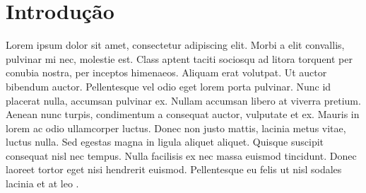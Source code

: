 \section{Introdução}
Lorem ipsum dolor sit amet, consectetur adipiscing elit. Morbi a elit convallis, pulvinar mi nec, molestie est. Class aptent taciti sociosqu ad litora torquent per conubia nostra, per inceptos himenaeos. Aliquam erat volutpat. Ut auctor bibendum auctor. Pellentesque vel odio eget lorem porta pulvinar. Nunc id placerat nulla, accumsan pulvinar ex. Nullam accumsan libero at viverra pretium. Aenean nunc turpis, condimentum a consequat auctor, vulputate et ex. Mauris in lorem ac odio ullamcorper luctus. Donec non justo mattis, lacinia metus vitae, luctus nulla. Sed egestas magna in ligula aliquet aliquet. Quisque suscipit consequat nisl nec tempus. Nulla facilisis ex nec massa euismod tincidunt. Donec laoreet tortor eget nisi hendrerit euismod. Pellentesque eu felis ut nisl sodales lacinia et at leo \cite{dummy2024article}.